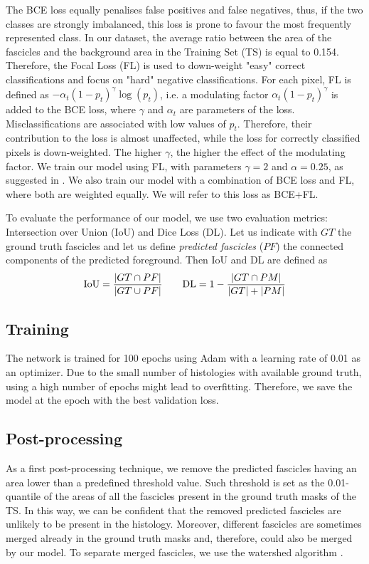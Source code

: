 \documentclass[conference]{IEEEtran}
\DeclarePairedDelimiter{\abs}{\lvert}{\rvert}	%
\begin{document}
The BCE loss equally penalises false positives and false negatives, thus, if the two classes are strongly imbalanced, this loss is prone to favour the most frequently represented class. In our dataset, the average ratio between the area of the fascicles and the background area in the Training Set (TS) is equal to 0.154. Therefore, the Focal Loss (FL) \cite{focal_loss} is used to down-weight "easy" correct classifications and focus on "hard" negative classifications. For each pixel, FL is defined as $-\alpha_t(1-p_t)^{\gamma}\log(p_t)$, i.e. a modulating factor $\alpha_t(1-p_t)^{\gamma}$ is added to the BCE loss, where $\gamma$ and $\alpha_t$ are parameters of the loss. Misclassifications are associated with low values of $p_t$. Therefore, their contribution to the loss is almost unaffected, while the loss for correctly classified pixels is down-weighted. The higher $\gamma$, the higher the effect of the modulating factor. We train our model using FL, with parameters $\gamma = 2$ and $\alpha = 0.25$, as suggested in \cite{focal_loss}. 
We also train our model with a combination of BCE loss and FL, where both are weighted equally. We will refer to this loss as BCE+FL. 

To evaluate the performance of our model, we use two evaluation metrics: Intersection over Union (IoU) and Dice Loss (DL). Let us indicate with $GT$ the ground truth fascicles and let us define \emph{predicted fascicles} ($PF$) the connected components of the predicted foreground. Then IoU and DL are defined as 
\begin{equation*}
    \mathrm{IoU} = \frac{\abs{GT \cap PF}}{\abs{GT \cup PF}} \qquad
    \mathrm{DL} = 1 - \frac{\abs{GT \cap PM}}{\abs{GT} + \abs{PM}}
\end{equation*}

\subsection{Training}
The network is trained for 100 epochs using Adam with a learning rate of 0.01 as an optimizer. Due to the small number of histologies with available ground truth, using a high number of epochs might lead to overfitting. Therefore, we save the model at the epoch with the best validation loss.

\subsection{Post-processing}
As a first post-processing technique, we remove the predicted fascicles having an area lower than a predefined threshold value. Such threshold is set as the 0.01-quantile of the areas of all the fascicles present in the ground truth masks of the TS. In this way, we can be confident that the removed predicted fascicles are unlikely to be present in the histology. 
Moreover, different fascicles are sometimes merged already in the ground truth masks and, therefore, could also be merged by our model. To separate merged fascicles, we use the watershed algorithm \cite{watershed_article, watershed_tutorial}. 
\end{document}
